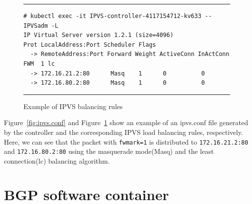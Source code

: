 \begin{figure}
  \centering
\rule{\columnwidth}{0.4pt}
\begin{verbatim}
# kubectl exec -it IPVS-controller-4117154712-kv633 -- IPVSadm -L
IP Virtual Server version 1.2.1 (size=4096)
Prot LocalAddress:Port Scheduler Flags
  -> RemoteAddress:Port Forward Weight ActiveConn InActConn
FWM  1 lc
  -> 172.16.21.2:80      Masq    1      0          0         
  -> 172.16.80.2:80      Masq    1      0          0
\end{verbatim}
\rule{\columnwidth}{0.4pt}
\caption{Example of IPVS balancing rules}
\label{fig:IPVS rule}
\end{figure}


Figure~\ref{fig:ipvs.conf} and Figure~\ref{fig:IPVS rule} show an example of an ipvs.conf file 
generated by the controller and the corresponding IPVS load balancing rules, respectively.
Here, we can see that the packet with {\tt fwmark=1}\cite{BertHubert2002} is distributed 
to {\tt 172.16.21.2:80} and {\tt 172.16.80.2:80} 
using the masquerade mode(Masq) and 
the least connection(lc)\cite{Zhang2000} balancing algorithm.


\section{BGP software container}\label{sec:bgp}

